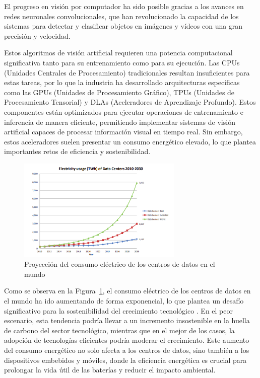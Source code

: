 \documentclass[11pt,spanish,listoffigures,listoftables]{tfgetsinf}
\begin{document}
El progreso en visión por computador ha sido posible gracias a los avances en redes neuronales convolucionales, que han revolucionado la capacidad de los sistemas para detectar y clasificar objetos en imágenes y vídeos con una gran precisión y velocidad.

Estos algoritmos de visión artificial requieren una potencia computacional significativa tanto para su entrenamiento como para su ejecución. Las CPUs (Unidades Centrales de Procesamiento) tradicionales resultan insuficientes para estas tareas, por lo que la industria ha desarrollado arquitecturas específicas como las GPUs (Unidades de Procesamiento Gráfico), TPUs (Unidades de Procesamiento Tensorial) y DLAs (Aceleradores de Aprendizaje Profundo). Estos componentes están optimizados para ejecutar operaciones de entrenamiento e inferencia de manera eficiente, permitiendo implementar sistemas de visión artificial capaces de procesar información visual en tiempo real. Sin embargo, estos aceleradores suelen presentar un consumo energético elevado, lo que plantea importantes retos de eficiencia y sostenibilidad.


\begin{figure}[H]
   \centering
   \includegraphics[width=0.7\textwidth]{images/introduccion/consumo_electrico_datacenters.png}
   \caption{Proyección del consumo eléctrico de los centros de datos en el mundo}
\label{fig:consumo_electrico_datacenters}
\end{figure}

Como se observa en la Figura~\ref{fig:consumo_electrico_datacenters}, el consumo eléctrico de los centros de datos en el mundo ha ido aumentando de forma exponencial, lo que plantea un desafío significativo para la sostenibilidad del crecimiento tecnológico \cite{challe6010117}. En el peor escenario, esta tendencia podría llevar a un incremento insostenible en la huella de carbono del sector tecnológico, mientras que en el mejor de los casos, la adopción de tecnologías eficientes podría moderar el crecimiento. Este aumento del consumo energético no solo afecta a los centros de datos, sino también a los dispositivos embebidos y móviles, donde la eficiencia energética es crucial para prolongar la vida útil de las baterías y reducir el impacto ambiental.
\end{document}
